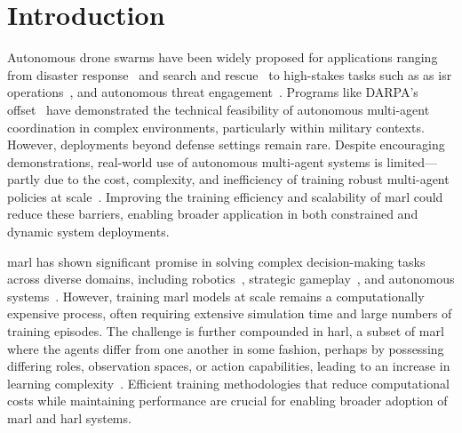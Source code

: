 \glsresetall

\section{Introduction}

Autonomous drone swarms have been widely proposed for applications ranging from 
disaster response~\cite{mohddaud2022} and search and rescue~\cite{mohddaud2022} 
to high-stakes tasks such as as \gls{isr} operations~\cite{hambling2021}, 
and autonomous threat engagement~\cite{rogers2022, kallenborn2024}. 
Programs like DARPA's \gls{offset}~\cite{zotero-2835} 
have demonstrated the technical feasibility of autonomous multi-agent coordination 
in complex environments, particularly within military contexts. However, 
deployments beyond defense settings remain rare. Despite encouraging demonstrations, 
real-world use of autonomous multi-agent systems is limited—partly due to the cost, 
complexity, and inefficiency of training robust multi-agent policies at scale~\cite{jin2025}. 
Improving the training efficiency and scalability of \gls{marl} 
could reduce these barriers, enabling broader application in both 
constrained and dynamic system deployments.

\Gls{marl} has shown significant promise in solving complex 
decision-making tasks across diverse domains, including 
robotics~\cite{rizk2019, liang2024}, 
strategic gameplay~\cite{silver2016, vinyals2019, berner2019}, 
and autonomous systems~\cite{abeywickrama2022}. 
However, training \gls{marl} models at scale remains a computationally expensive process, 
often requiring extensive simulation time and large numbers of training episodes. 
The challenge is further compounded in \gls{harl}, 
a subset of \gls{marl} where the agents 
differ from one another in some fashion, perhaps by possessing 
differing roles, observation spaces, 
or action capabilities, leading to an increase in learning complexity~\cite{rizk2019, yang2021a}.
Efficient training methodologies that reduce computational costs while maintaining 
performance are crucial for enabling broader adoption of \gls{marl} and \gls{harl} systems.

